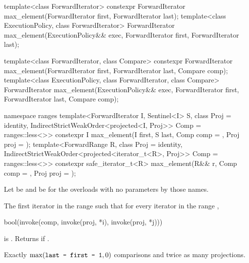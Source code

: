 %
\begin{itemdecl}
template<class ForwardIterator>
  constexpr ForwardIterator max_element(ForwardIterator first, ForwardIterator last);
template<class ExecutionPolicy, class ForwardIterator>
  ForwardIterator max_element(ExecutionPolicy&& exec,
                              ForwardIterator first, ForwardIterator last);

template<class ForwardIterator, class Compare>
  constexpr ForwardIterator max_element(ForwardIterator first, ForwardIterator last,
                                        Compare comp);
template<class ExecutionPolicy, class ForwardIterator, class Compare>
  ForwardIterator max_element(ExecutionPolicy&& exec,
                              ForwardIterator first, ForwardIterator last,
                              Compare comp);

namespace ranges {
  template<ForwardIterator I, Sentinel<I> S, class Proj = identity,
      IndirectStrictWeakOrder<projected<I, Proj>> Comp = ranges::less<>>
    constexpr I max_element(I first, S last, Comp comp = {}, Proj proj = {});
  template<ForwardRange R, class Proj = identity,
      IndirectStrictWeakOrder<projected<iterator_t<R>, Proj>> Comp = ranges::less<>>
    constexpr safe_iterator_t<R>
      max_element(R&& r, Comp comp = {}, Proj proj = {});
}
\end{itemdecl}

\begin{itemdescr}
\pnum
Let  be 
and  be 
for the overloads with no parameters by those names.

\pnum
\returns
The first iterator
in the range
such that for every iterator
in the range
,
\begin{codeblock}
bool(invoke(comp, invoke(proj, *i), invoke(proj, *j)))
\end{codeblock}
is .
Returns
if
.

\pnum
\complexity
Exactly
$\max(\texttt{last - first - 1}, 0)$
comparisons and twice as many projections.
\end{itemdescr}

